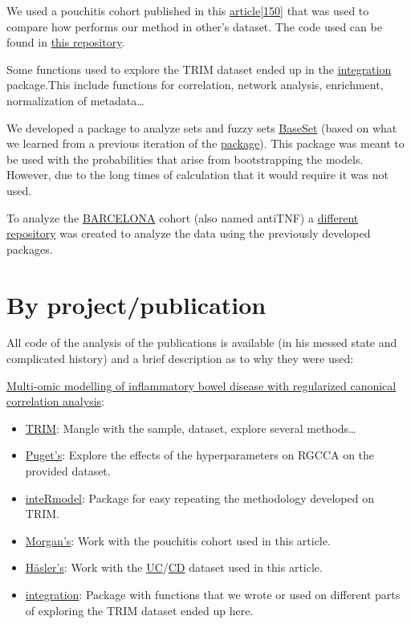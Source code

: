 \documentclass[
  12pt,
  a4paper,
  twoside,
  openright]{book}
\providecommand{\tightlist}{%
  \setlength{\itemsep}{0pt}\setlength{\parskip}{0pt}}
\begin{document}
We used a pouchitis cohort published in this \href{https://dx.doi.org/10.1186/s13059-015-0637-x}{article}{[}\protect\hyperlink{ref-morgan2015}{150}{]} that was used to compare how performs our method in other's dataset.
The code used can be found in \href{https://github.com/llrs/pouchitis}{this repository}.

Some functions used to explore the TRIM dataset ended up in the \href{https://github.com/llrs/integration-helper}{integration} package.This include functions for correlation, network analysis, enrichment, normalization of metadata\ldots{}

We developed a package to analyze sets and fuzzy sets \href{https://github.com/rOpenSci/BaseSet}{BaseSet} (based on what we learned from a previous iteration of the \href{https://github.com/llrs/GSEAdv}{package}).
This package was meant to be used with the probabilities that arise from bootstrapping the models.
However, due to the long times of calculation that it would require it was not used.

To analyze the \protect\hyperlink{acronyms_BARCELONA}{BARCELONA} cohort (also named antiTNF) a \href{https://github.com/llrs/Barcelona}{different repository} was created to analyze the data using the previously developed packages.

\hypertarget{by-projectpublication}{%
\section{By project/publication}\label{by-projectpublication}}

All code of the analysis of the publications is available (in his messed state and complicated history) and a brief description as to why they were used:

\href{https://journals.plos.org/plosone/article?id=10.1371/journal.pone.0246367}{Multi-omic modelling of inflammatory bowel disease with regularized canonical correlation analysis}:

\begin{itemize}
\tightlist
\item
  \href{https://github.com/llrs/TRIM}{TRIM}: Mangle with the sample, dataset, explore several methods\ldots{}
\item
  \href{https://github.com/llrs/sgcca_hyperparameters}{Puget's}: Explore the effects of the hyperparameters on RGCCA on the provided dataset.
\item
  \href{https://github.com/llrs/inteRmodel}{inteRmodel}: Package for easy repeating the methodology developed on TRIM.
\item
  \href{https://github.com/llrs/pouchitis}{Morgan's}: Work with the pouchitis cohort used in this article.
\item
  \href{https://github.com/llrs/Uncoupling}{Häsler's}: Work with the \protect\hyperlink{acronyms_UC}{UC}/\protect\hyperlink{acronyms_CD}{CD} dataset used in this article.
\item
  \href{https://github.com/llrs/integration-helper}{integration}: Package with functions that we wrote or used on different parts of exploring the TRIM dataset ended up here.
\end{itemize}
\end{document}
